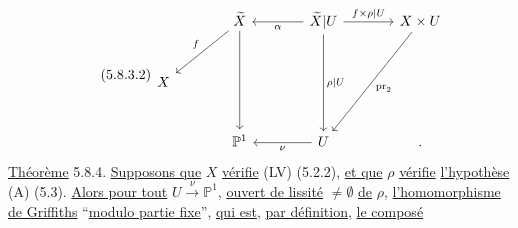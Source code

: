 \begin{equation}\tag{5.8.3.2}
\begin{tikzcd}[row sep=large, column sep=large]
 {} & \widetilde{X} \arrow[dl, "f"'] \arrow[dd] & \widetilde{X}|U \arrow[l, "\alpha"] \arrow[r, "f\times\rho|U"] \arrow[dd, "\rho|U"] & X\times U \arrow[ddl, "\mathrm{pr}_2"] \\
X & {} & {} & {} \\
 {} & \mathbb{P}^1 & U \arrow[l, "\nu"] & .
\end{tikzcd}
\end{equation}
\underline{Théorème} 5.8.4. \underline{Supposons que} $X$ \underline{vérifie} (LV) (5.2.2), \underline{et que} $\rho$ \underline{vérifie} \underline{l'hypothèse} (A) (5.3). \underline{Alors pour tout} $U \xrightarrow{\ \nu\ } \mathbb{P}^1$, \underline{ouvert de lissité} $\neq \emptyset$ \underline{de} $\rho$, \underline{l'homomorphisme de Griffiths} ``\underline{modulo partie fixe}'', \underline{qui est}, \underline{par définition}, \underline{le composé}

